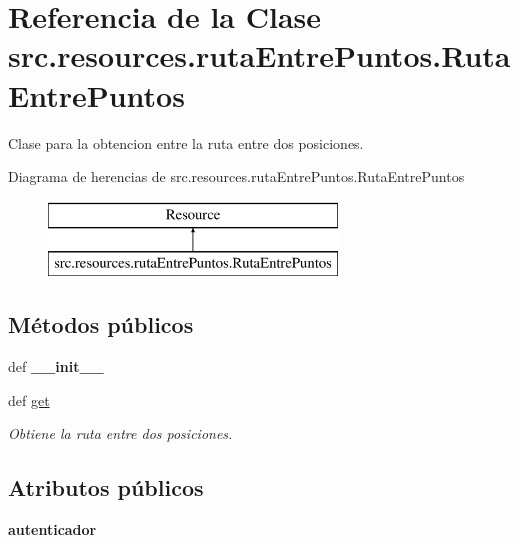 \hypertarget{classsrc_1_1resources_1_1ruta_entre_puntos_1_1_ruta_entre_puntos}{\section{Referencia de la Clase src.\-resources.\-ruta\-Entre\-Puntos.\-Ruta\-Entre\-Puntos}
\label{classsrc_1_1resources_1_1ruta_entre_puntos_1_1_ruta_entre_puntos}
}


Clase para la obtencion entre la ruta entre dos posiciones.  


Diagrama de herencias de src.\-resources.\-ruta\-Entre\-Puntos.\-Ruta\-Entre\-Puntos\begin{figure}[H]
\begin{center}
\leavevmode
\includegraphics[height=2.000000cm]{classsrc_1_1resources_1_1ruta_entre_puntos_1_1_ruta_entre_puntos}
\end{center}
\end{figure}
\subsection*{Métodos públicos}
\begin{DoxyCompactItemize}
\item 
\hypertarget{classsrc_1_1resources_1_1ruta_entre_puntos_1_1_ruta_entre_puntos_a7fd0962af4dda6c52f4ab1ff6704614f}{def {\bfseries \-\_\-\-\_\-init\-\_\-\-\_\-}}\label{classsrc_1_1resources_1_1ruta_entre_puntos_1_1_ruta_entre_puntos_a7fd0962af4dda6c52f4ab1ff6704614f}

\item 
def \hyperlink{classsrc_1_1resources_1_1ruta_entre_puntos_1_1_ruta_entre_puntos_a14da5f2af9a498be67347a773d11164f}{get}
\begin{DoxyCompactList}\small\item\em Obtiene la ruta entre dos posiciones. \end{DoxyCompactList}\end{DoxyCompactItemize}
\subsection*{Atributos públicos}
\begin{DoxyCompactItemize}
\item 
\hypertarget{classsrc_1_1resources_1_1ruta_entre_puntos_1_1_ruta_entre_puntos_a1df9f4b1f43d71c7d3c08009ec14c328}{{\bfseries autenticador}}\label{classsrc_1_1resources_1_1ruta_entre_puntos_1_1_ruta_entre_puntos_a1df9f4b1f43d71c7d3c08009ec14c328}

\end{DoxyCompactItemize}
